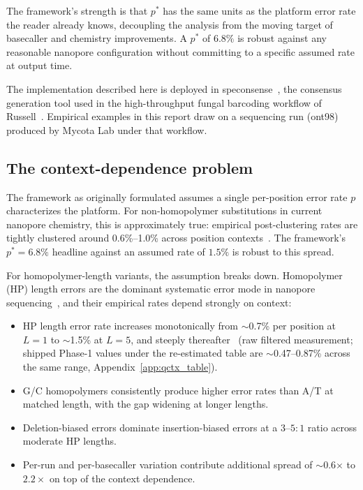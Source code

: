 \documentclass[11pt]{article}
\begin{document}
The framework's strength is that $p^*$ has the same units as the platform error
rate the reader already knows, decoupling the analysis from the moving target
of basecaller and chemistry improvements. A $p^*$ of $6.8\%$ is robust against
any reasonable nanopore configuration without committing to a specific assumed
rate at output time.

The implementation described here is deployed in speconsense~\cite{speconsense},
the consensus generation tool used in the high-throughput fungal barcoding
workflow of Russell~\cite{russell2023}. Empirical examples in this report draw
on a sequencing run (ont98) produced by Mycota Lab under that workflow.

\subsection{The context-dependence problem}

The framework as originally formulated assumes a single per-position error rate
$p$ characterizes the platform. For non-homopolymer substitutions in current
nanopore chemistry, this is approximately true: empirical post-clustering rates
are tightly clustered around 0.6\%--1.0\% across position contexts~\cite{hp_paper}.
The framework's $p^* = 6.8\%$ headline against an assumed rate of $1.5\%$ is
robust to this spread.

For homopolymer-length variants, the assumption breaks down. Homopolymer (HP)
length errors are the dominant systematic error mode in nanopore
sequencing~\cite{delahaye2021}, and their empirical rates depend strongly on
context:

\begin{itemize}
\item HP length error rate increases monotonically from $\sim$0.7\% per position
at $L = 1$ to $\sim$1.5\% at $L = 5$, and steeply thereafter~\cite{hp_paper}
(raw filtered measurement; shipped Phase-1 values under the re-estimated
table are $\sim$0.47--0.87\% across the same range, Appendix~\ref{app:qctx_table}).
\item G/C homopolymers consistently produce higher error rates than A/T at
matched length, with the gap widening at longer lengths.
\item Deletion-biased errors dominate insertion-biased errors at a $3$--$5\!:\!1$
ratio across moderate HP lengths.
\item Per-run and per-basecaller variation contribute additional spread of
$\sim$0.6$\times$ to $2.2\times$ on top of the context dependence.
\end{itemize}
\end{document}
